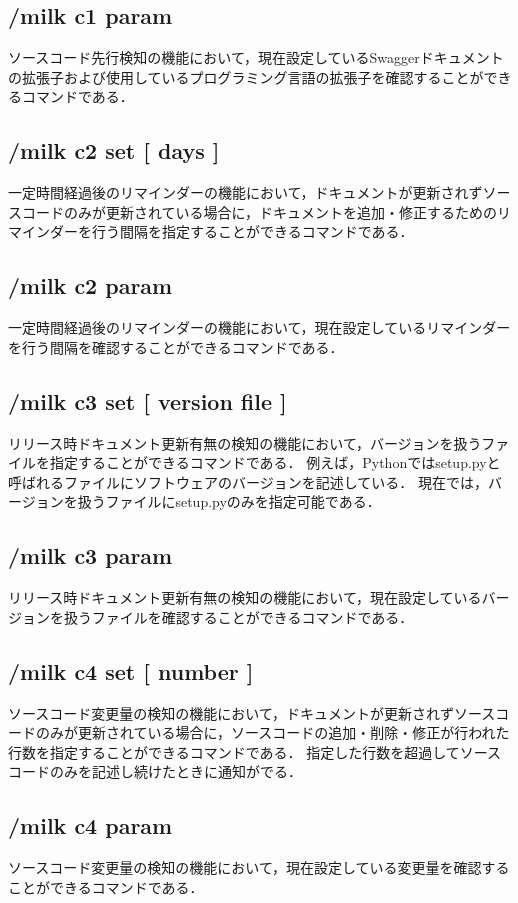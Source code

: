 \subsection*{/milk c1 param}
ソースコード先行検知の機能において，現在設定しているSwaggerドキュメントの拡張子および使用しているプログラミング言語の拡張子を確認することができるコマンドである．

\subsection*{/milk c2 set [ days ]}
一定時間経過後のリマインダーの機能において，ドキュメントが更新されずソースコードのみが更新されている場合に，ドキュメントを追加・修正するためのリマインダーを行う間隔を指定することができるコマンドである．

\subsection*{/milk c2 param}
一定時間経過後のリマインダーの機能において，現在設定しているリマインダーを行う間隔を確認することができるコマンドである．

\subsection*{/milk c3 set [ version file ]}
リリース時ドキュメント更新有無の検知の機能において，バージョンを扱うファイルを指定することができるコマンドである．
例えば，Pythonではsetup.pyと呼ばれるファイルにソフトウェアのバージョンを記述している．
現在では，バージョンを扱うファイルにsetup.pyのみを指定可能である．

\subsection*{/milk c3 param}
リリース時ドキュメント更新有無の検知の機能において，現在設定しているバージョンを扱うファイルを確認することができるコマンドである．

\subsection*{/milk c4 set [ number ]}
ソースコード変更量の検知の機能において，ドキュメントが更新されずソースコードのみが更新されている場合に，ソースコードの追加・削除・修正が行われた行数を指定することができるコマンドである．
指定した行数を超過してソースコードのみを記述し続けたときに通知がでる．

\subsection*{/milk c4 param}
ソースコード変更量の検知の機能において，現在設定している変更量を確認することができるコマンドである．
